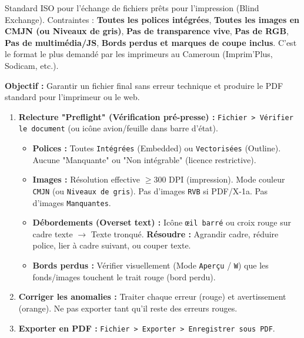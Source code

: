 \documentclass[11pt]{article}
\begin{document}
\begin{definition}
    Standard ISO pour l'échange de fichiers prêts pour l'impression (Blind Exchange). Contraintes : \textbf{Toutes les polices intégrées}, \textbf{Toutes les images en CMJN (ou Niveaux de gris)}, \textbf{Pas de transparence vive}, \textbf{Pas de RGB}, \textbf{Pas de multimédia/JS}, \textbf{Bords perdus et marques de coupe inclus}. C'est le format le plus demandé par les imprimeurs au Cameroun (Imprim'Plus, Sodicam, etc.).
\end{definition}

\begin{methode}
    \textbf{Objectif :} Garantir un fichier final sans erreur technique et produire le PDF standard pour l'imprimeur ou le web.
    \begin{enumerate}
        \item \textbf{Relecture "Preflight" (Vérification pré-presse) :} \texttt{Fichier > Vérifier le document} (ou icône avion/feuille dans barre d'état).
              \begin{itemize}
                  \item \textbf{Polices :} Toutes \texttt{Intégrées} (Embedded) ou \texttt{Vectorisées} (Outline). Aucune "Manquante" ou "Non intégrable" (licence restrictive).
                  \item \textbf{Images :} Résolution effective $\ge 300$ DPI (impression). Mode couleur \texttt{CMJN} (ou \texttt{Niveaux de gris}). Pas d'images \texttt{RVB} si PDF/X-1a. Pas d'images \texttt{Manquantes}.
                  \item \textbf{Débordements (Overset text) :} Icône \texttt{œil barré} ou croix rouge sur cadre texte $\rightarrow$ Texte tronqué. \textbf{Résoudre :} Agrandir cadre, réduire police, lier à cadre suivant, ou couper texte.
                  \item \textbf{Bords perdus :} Vérifier visuellement (Mode \texttt{Aperçu} / \texttt{W}) que les fonds/images touchent le trait rouge (bord perdu).
              \end{itemize}
        \item \textbf{Corriger les anomalies :} Traiter chaque erreur (rouge) et avertissement (orange). Ne pas exporter tant qu'il reste des erreurs rouges.
        \item \textbf{Exporter en PDF :} \texttt{Fichier > Exporter > Enregistrer sous PDF}.
              \begin{itemize}

\end{itemize}
\end{enumerate}
\end{methode}
\end{document}
